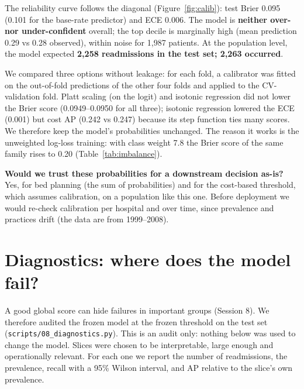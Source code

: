 \documentclass[11pt,a4paper]{article}
\newcommand{\code}[1]{\texttt{\small #1}}
\begin{document}
The reliability curve follows the diagonal (Figure~\ref{fig:calib}): test Brier 0.095 (0.101 for the base-rate predictor) and ECE 0.006. The model is \textbf{neither over- nor under-confident} overall; the top decile is marginally high (mean prediction 0.29 vs 0.28 observed), within noise for 1{,}987 patients. At the population level, the model expected \textbf{2{,}258 readmissions in the test set; 2{,}263 occurred}.

We compared three options without leakage: for each fold, a calibrator was fitted on the out-of-fold predictions of the other four folds and applied to the CV-validation fold. Platt scaling (on the logit) and isotonic regression did not lower the Brier score (0.0949--0.0950 for all three); isotonic regression lowered the ECE (0.001) but cost AP (0.242 vs 0.247) because its step function ties many scores. We therefore keep the model's probabilities unchanged. The reason it works is the unweighted log-loss training: with class weight 7.8 the Brier score of the same family rises to 0.20 (Table~\ref{tab:imbalance}).

\textbf{Would we trust these probabilities for a downstream decision as-is?} Yes, for bed planning (the sum of probabilities) and for the cost-based threshold, which assumes calibration, on a population like this one. Before deployment we would re-check calibration per hospital and over time, since prevalence and practices drift (the data are from 1999--2008).

\section{Diagnostics: where does the model fail?}
\label{sec:diag}

A good global score can hide failures in important groups (Session 8). We therefore audited the frozen model at the frozen threshold on the test set (\code{scripts/08\_diagnostics.py}). This is an audit only: nothing below was used to change the model. Slices were chosen to be interpretable, large enough and operationally relevant. For each one we report the number of readmissions, the prevalence, recall with a 95\% Wilson interval, and AP relative to the slice's own prevalence.
\end{document}
